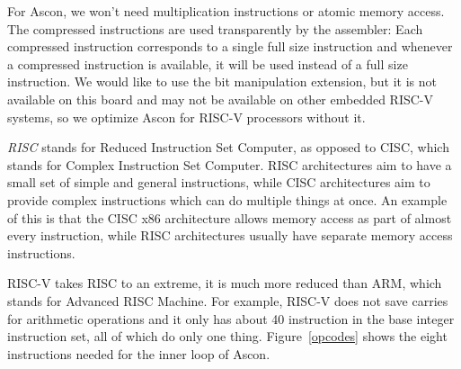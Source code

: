For Ascon, we won't need multiplication instructions or atomic memory access.
The compressed instructions are used transparently by the assembler: Each
compressed instruction corresponds to a single full size instruction and
whenever a compressed instruction is available, it will be used instead of a
full size instruction. We would like to use the bit manipulation extension, but
it is not available on this board and may not be available on other embedded
RISC-V systems, so we optimize Ascon for RISC-V processors without it.

\emph{RISC} stands for Reduced Instruction Set Computer, as opposed to CISC,
which stands for Complex Instruction Set Computer. RISC architectures aim to
have a small set of simple and general instructions, while CISC architectures
aim to provide complex instructions which can do multiple things at once. An
example of this is that the CISC x86 architecture allows memory access as part
of almost every instruction, while RISC architectures usually have separate
memory access instructions.

RISC-V takes RISC to an extreme, it is much more reduced than ARM, which stands
for Advanced RISC Machine. For example, RISC-V does not save carries for
arithmetic operations and it only has about 40 instruction in the base integer
instruction set, all of which do only one thing. Figure~\ref{opcodes} shows the
eight instructions needed for the inner loop of Ascon.


